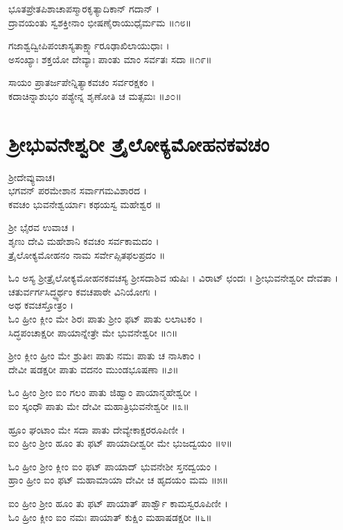 ಭೂತಪ್ರೇತಪಿಶಾಚಾಪಸ್ಮಾರಕೃತ್ಯಾದಿಕಾನ್ ಗದಾನ್ ।\\
ದ್ರಾವಯಂತು ಸ್ವಶಕ್ತೀನಾಂ ಭೀಷಣೈರಾಯುಧೈರ್ಮಮ ॥೧೮॥

ಗಜಾಶ್ವದ್ವೀಪಿಪಂಚಾಸ್ಯತಾರ್ಕ್ಷ್ಯಾರೂಢಾಖಿಲಾಯುಧಾಃ ।\\
ಅಸಂಖ್ಯಾಃ ಶಕ್ತಯೋ ದೇವ್ಯಾಃ ಪಾಂತು ಮಾಂ ಸರ್ವತಃ ಸದಾ ॥೧೯॥

ಸಾಯಂ ಪ್ರಾತರ್ಜಪೇನ್ನಿತ್ಯಾಕವಚಂ ಸರ್ವರಕ್ಷಕಂ ।\\
ಕದಾಚಿನ್ನಾಶುಭಂ ಪಶ್ಯೇನ್ನ ಶೃಣೋತಿ ಚ ಮತ್ಸಮಃ ॥೨೦॥

\section{ಶ್ರೀಭುವನೇಶ್ವರೀ ತ್ರೈಲೋಕ್ಯಮೋಹನಕವಚಂ}

ಶ್ರೀದೇವ್ಯುವಾಚ।\\
ಭಗವನ್ ಪರಮೇಶಾನ ಸರ್ವಾಗಮವಿಶಾರದ ।\\
ಕವಚಂ ಭುವನೇಶ್ವರ್ಯಾಃ ಕಥಯಸ್ವ ಮಹೇಶ್ವರ ॥

ಶ್ರೀ ಭೈರವ ಉವಾಚ ।\\
ಶೃಣು ದೇವಿ ಮಹೇಶಾನಿ ಕವಚಂ ಸರ್ವಕಾಮದಂ ।\\
ತ್ರೈಲೋಕ್ಯಮೋಹನಂ ನಾಮ ಸರ್ವೇಪ್ಸಿತಫಲಪ್ರದಂ ॥

ಓಂ ಅಸ್ಯ ಶ್ರೀತ್ರೈಲೋಕ್ಯಮೋಹನಕವಚಸ್ಯ ಶ್ರೀಸದಾಶಿವ ಋಷಿಃ । ವಿರಾಟ್ ಛಂದಃ । ಶ್ರೀಭುವನೇಶ್ವರೀ ದೇವತಾ । ಚತುರ್ವರ್ಗಸಿದ್ಧ್ಯರ್ಥಂ ಕವಚಪಾಠೇ ವಿನಿಯೋಗಃ ।\\

ಅಥ ಕವಚಸ್ತೋತ್ರಂ ।\\
ಓಂ ಹ್ರೀಂ ಕ್ಲೀಂ ಮೇ ಶಿರಃ ಪಾತು ಶ್ರೀಂ ಫಟ್ ಪಾತು ಲಲಾಟಕಂ ।\\
ಸಿದ್ಧಪಂಚಾಕ್ಷರೀ ಪಾಯಾನ್ನೇತ್ರೇ ಮೇ ಭುವನೇಶ್ವರೀ ॥೧॥

ಶ್ರೀಂ ಕ್ಲೀಂ ಹ್ರೀಂ ಮೇ ಶ್ರುತೀಃ ಪಾತು ನಮಃ ಪಾತು ಚ ನಾಸಿಕಾಂ ।\\
ದೇವೀ ಷಡಕ್ಷರೀ ಪಾತು ವದನಂ ಮುಂಡಭೂಷಣಾ ॥೨॥

ಓಂ ಹ್ರೀಂ ಶ್ರೀಂ ಐಂ ಗಲಂ ಪಾತು ಜಿಹ್ವಾಂ ಪಾಯಾನ್ಮಹೇಶ್ವರೀ ।\\
ಐಂ ಸ್ಕಂಧೌ ಪಾತು ಮೇ ದೇವೀ ಮಹಾತ್ರಿಭುವನೇಶ್ವರೀ ॥೩॥

ಹ್ರೂಂ ಘಂಟಾಂ ಮೇ ಸದಾ ಪಾತು ದೇವ್ಯೇಕಾಕ್ಷರರೂಪಿಣೀ ।\\
ಐಂ ಹ್ರೀಂ ಶ್ರೀಂ ಹೂಂ ತು ಫಟ್ ಪಾಯಾದೀಶ್ವರೀ ಮೇ ಭುಜದ್ವಯಂ ॥೪॥

ಓಂ ಹ್ರೀಂ ಶ್ರೀಂ ಕ್ಲೀಂ ಐಂ ಫಟ್ ಪಾಯಾದ್ ಭುವನೇಶೀ ಸ್ತನದ್ವಯಂ ।\\
ಹ್ರಾಂ ಹ್ರೀಂ ಐಂ ಫಟ್ ಮಹಾಮಾಯಾ ದೇವೀ ಚ ಹೃದಯಂ ಮಮ ॥೫॥

ಐಂ ಹ್ರೀಂ ಶ್ರೀಂ ಹೂಂ ತು ಫಟ್ ಪಾಯಾತ್ ಪಾರ್ಶ್ವೌ ಕಾಮಸ್ವರೂಪಿಣೀ ।\\
ಓಂ ಹ್ರೀಂ ಕ್ಲೀಂ ಐಂ ನಮಃ ಪಾಯಾತ್ ಕುಕ್ಷಿಂ ಮಹಾಷಡಕ್ಷರೀ ॥೬॥

